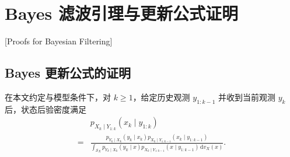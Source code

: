 \chapter{Bayes 滤波引理与更新公式证明}[Proofs for Bayesian Filtering]\label{cw:app:appendix}


\section{Bayes 更新公式的证明}\label{cw:app:proofs}

\begin{theorem}\label{cw:thm:bayes}

在本文约定与模型条件下，对 $k\geq1$，给定历史观测 $y_{1:k-1}$ 并收到当前观测 $y_k$ 后，状态后验密度满足
\begin{equation}\label{cw:eq:15}
\begin{aligned}
&p_{X_k\mid Y_{1:k}}(x_k\mid y_{1:k})\\
= &\frac{p_{Y_k\mid X_k}(y_k\mid x_k)p_{X_k\mid Y_{1:k-1}}(x_k\mid y_{1:k-1})}
{\displaystyle\int_{\mathcal{S}_X}p_{Y_k\mid X_k}(y_k\mid x)p_{X_k\mid Y_{1:k-1}}(x\mid y_{1:k-1})\,\mathrm{d}v_X(x)}.
\end{aligned}
\end{equation}

\end{theorem}

